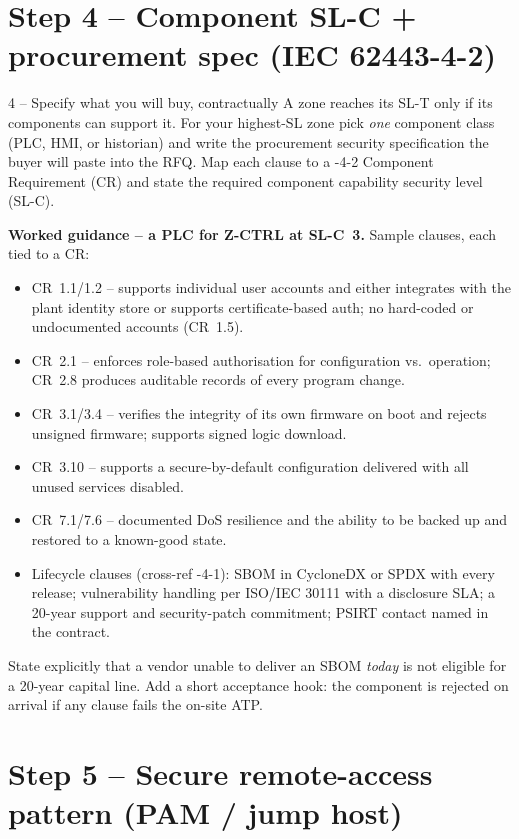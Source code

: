 \documentclass[11pt,a4paper]{article}
\begin{document}
\section*{Step 4 -- Component SL-C + procurement spec (IEC 62443-4-2)}

\begin{stepbox}{4 -- Specify what you will buy, contractually}
A zone reaches its SL-T only if its components can support it. For your
highest-SL zone pick \emph{one} component class (PLC, HMI, or historian)
and write the procurement security specification the buyer will paste
into the RFQ. Map each clause to a -4-2 Component Requirement (CR) and
state the required component capability security level (SL-C).

\medskip
\noindent\textbf{Worked guidance -- a PLC for Z-CTRL at SL-C~3.}
Sample clauses, each tied to a CR:
\begin{itemize}\setlength{\itemsep}{1pt}
  \item CR~1.1/1.2 -- supports individual user accounts and either
    integrates with the plant identity store or supports certificate-based
    auth; no hard-coded or undocumented accounts (CR~1.5).
  \item CR~2.1 -- enforces role-based authorisation for configuration vs.\
    operation; CR~2.8 produces auditable records of every program change.
  \item CR~3.1/3.4 -- verifies the integrity of its own firmware on boot
    and rejects unsigned firmware; supports signed logic download.
  \item CR~3.10 -- supports a secure-by-default configuration delivered
    with all unused services disabled.
  \item CR~7.1/7.6 -- documented DoS resilience and the ability to be
    backed up and restored to a known-good state.
  \item Lifecycle clauses (cross-ref -4-1): SBOM in CycloneDX or SPDX
    with every release; vulnerability handling per ISO/IEC 30111 with a
    disclosure SLA; a 20-year support and security-patch commitment;
    PSIRT contact named in the contract.
\end{itemize}
State explicitly that a vendor unable to deliver an SBOM \emph{today} is
not eligible for a 20-year capital line. Add a short acceptance hook:
the component is rejected on arrival if any clause fails the on-site ATP.
\end{stepbox}

\section*{Step 5 -- Secure remote-access pattern (PAM / jump host)}
\end{document}
